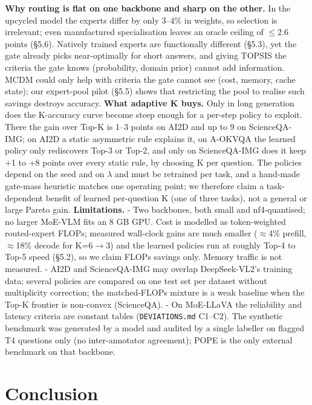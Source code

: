 \textbf{Why routing is flat on one backbone and sharp on the other.} In the upcycled model the experts differ by only 3--4\% in weights, so selection is irrelevant; even manufactured specialisation leaves an oracle ceiling of $\leq$2.6 points (§5.6). Natively trained experts are functionally different (§5.3), yet the gate already picks near-optimally for short answers, and giving TOPSIS the criteria the gate knows (probability, domain prior) cannot add information. MCDM could only help with criteria the gate cannot see (cost, memory, cache state); our expert-pool pilot (§5.5) shows that restricting the pool to realise such savings destroys accuracy.
\textbf{What adaptive K buys.} Only in long generation does the K-accuracy curve become steep enough for a per-step policy to exploit. There the gain over Top-K is 1--3 points on AI2D and up to 9 on ScienceQA-IMG; on AI2D a static asymmetric rule explains it, on A-OKVQA the learned policy only rediscovers Top-3 or Top-2, and only on ScienceQA-IMG does it keep +1 to +8 points over every static rule, by choosing K per question. The policies depend on the seed and on $\lambda$ and must be retrained per task, and a hand-made gate-mass heuristic matches one operating point; we therefore claim a task-dependent benefit of learned per-question K (one of three tasks), not a general or large Pareto gain.
\textbf{Limitations.}
- Two backbones, both small and nf4-quantised; no larger MoE-VLM fits an 8 GB GPU. Cost is modelled as token-weighted routed-expert FLOPs; measured wall-clock gains are much smaller ($\approx$4\% prefill, $\approx$18\% decode for K=6$\rightarrow$3) and the learned policies run at roughly Top-4 to Top-5 speed (§5.2), so we claim FLOPs savings only. Memory traffic is not measured.
- AI2D and ScienceQA-IMG may overlap DeepSeek-VL2's training data; several policies are compared on one test set per dataset without multiplicity correction; the matched-FLOPs mixture is a weak baseline when the Top-K frontier is non-convex (ScienceQA).
- On MoE-LLaVA the reliability and latency criteria are constant tables (\texttt{DEVIATIONS.md} C1--C2). The synthetic benchmark was generated by a model and audited by a single labeller on flagged T4 questions only (no inter-annotator agreement); POPE is the only external benchmark on that backbone.

\section{Conclusion}\label{conclusion}

